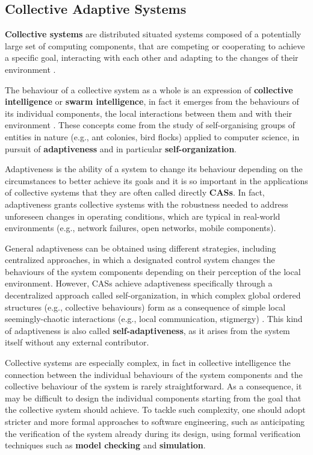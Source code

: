 
\subsection{Collective Adaptive Systems}
\label{section:background:concepts:cas}

\textbf{Collective systems} are distributed situated systems composed of a
potentially large set of computing components, that are competing or cooperating
to achieve a specific goal, interacting with each other and adapting to the
changes of their environment \cite{CAS}.

The behaviour of a collective system as a whole is an expression of
\textbf{collective intelligence} or \textbf{swarm intelligence}, in fact it
emerges from the behaviours of its individual components, the local
interactions between them and with their environment \cite{SwarmIntelligence}.
These concepts come from the study of self-organising groups of entities in
nature (e.g., ant colonies, bird flocks) applied to computer science, in
pursuit of \textbf{adaptiveness} and in particular \textbf{self-organization}.

Adaptiveness is the ability of a system to change its behaviour depending on
the circumstances to better achieve its goals and it is so important in the
applications of collective systems that they are often called directly
\textbf{\acp{CAS}}. In fact, adaptiveness grants collective systems with the
robustness needed to address unforeseen changes in operating conditions, which
are typical in real-world environments (e.g., network failures, open networks,
mobile components).

General adaptiveness can be obtained using different strategies, including
centralized approaches, in which a designated control system changes the
behaviours of the system components depending on their perception of the local
environment. However, \acp{CAS} achieve adaptiveness specifically through a
decentralized approach called self-organization, in which complex global
ordered structures (e.g., collective behaviours) form as a consequence of
simple local seemingly-chaotic interactions (e.g., local communication,
stigmergy) \cite{SelfOrganization}. This kind of adaptiveness is also called
\textbf{self-adaptiveness}, as it arises from the system itself without any
external contributor.

Collective systems are especially complex, in fact in collective intelligence
the connection between the individual behaviours of the system components and
the collective behaviour of the system is rarely straightforward. As a
consequence, it may be difficult to design the individual components starting
from the goal that the collective system should achieve. To tackle such
complexity, one should adopt stricter and more formal approaches to software
engineering, such as anticipating the verification of the system already during
its design, using formal verification techniques such as \textbf{model
checking} and \textbf{simulation}.

